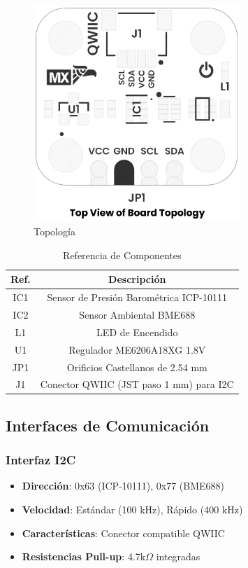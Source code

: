 \documentclass[11pt,a4paper]{article}
\begin{document}
\begin{figure}[H]
\centering
\includegraphics[width=0.7\textwidth]{es_unit_topology_v_1_0_0_icp10111_barometric_pressure_sensor.png}
\caption{Topología}
\label{fig:es-unit-topology-v-1-0-0-icp10111-barometric-pressure-sensor-png}
\end{figure}




\begin{table}[H]
\centering
\small
\begin{tabular}{|c|c|}
\hline
Ref. & Descripción \\
\hline
IC1 & Sensor de Presión Barométrica ICP-10111 \\
IC2 & Sensor Ambiental BME688 \\
L1 & LED de Encendido \\
U1 & Regulador ME6206A18XG 1.8V \\
JP1 & Orificios Castellanos de 2.54 mm \\
J1 & Conector QWIIC (JST paso 1 mm) para I2C \\
\hline
\end{tabular}
\caption{Referencia de Componentes}
\end{table}


\subsection{Interfaces de Comunicación}

\subsubsection{Interfaz I2C}
\begin{itemize}
\item \textbf{Dirección}: 0x63 (ICP-10111), 0x77 (BME688)
\item \textbf{Velocidad}: Estándar (100 kHz), Rápido (400 kHz)
\item \textbf{Características}: Conector compatible QWIIC
\item \textbf{Resistencias Pull-up}: 4.7k$\Omega$ integradas
\end{itemize}
\end{document}
